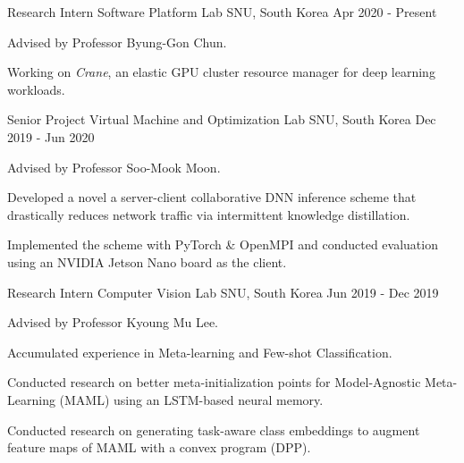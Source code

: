 

\begin{cventries}

  \cventry
    {Research Intern} %
    {Software Platform Lab} %
    {SNU, South Korea} %
    {Apr 2020 - Present} %
    {
      \begin{cvitems} %
        \item {Advised by Professor Byung-Gon Chun.}
        \item {Working on \textit{Crane}, an elastic GPU cluster resource manager for deep learning workloads.}
      \end{cvitems}
    }
    
  \cventry
    {Senior Project} %
    {Virtual Machine and Optimization Lab} %
    {SNU, South Korea} %
    {Dec 2019 - Jun 2020} %
    {
      \begin{cvitems} %
        \item {Advised by Professor Soo-Mook Moon.}
        \item {Developed a novel a server-client collaborative DNN inference scheme that drastically reduces network traffic via intermittent knowledge distillation.}
        \item {Implemented the scheme with PyTorch \& OpenMPI and conducted evaluation using an NVIDIA Jetson Nano board as the client.}
      \end{cvitems}
    }
    
  \cventry
    {Research Intern} %
    {Computer Vision Lab} %
    {SNU, South Korea} %
    {Jun 2019 - Dec 2019} %
    {
      \begin{cvitems} %
        \item {Advised by Professor Kyoung Mu Lee.}
        \item {Accumulated experience in Meta-learning and Few-shot Classification.}
        \item {Conducted research on better meta-initialization points for Model-Agnostic Meta-Learning (MAML) using an LSTM-based neural memory.}
        \item {Conducted research on generating task-aware class embeddings to augment feature maps of MAML with a convex program (DPP).}
      \end{cvitems}
    }
    

\end{cventries}

